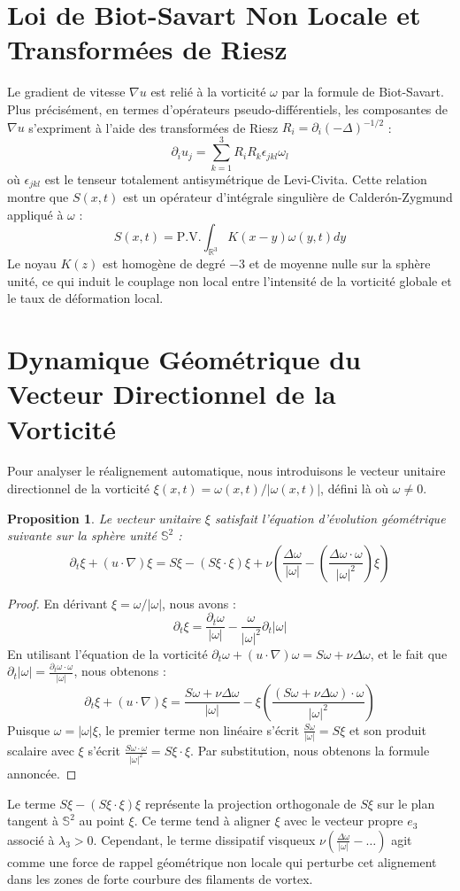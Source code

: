 \documentclass[11pt,a4paper]{article}
\newtheorem{proposition}[theorem]{Proposition}
\begin{document}
\section{Loi de Biot-Savart Non Locale et Transformées de Riesz}
Le gradient de vitesse $\nabla u$ est relié à la vorticité $\omega$ par la formule de Biot-Savart.
Plus précisément, en termes d'opérateurs pseudo-différentiels, les composantes de $\nabla u$ s'expriment à l'aide des transformées de Riesz $R_i = \partial_i (-\Delta)^{-1/2}$ :
$$ \partial_i u_j = \sum_{k=1}^3 R_i R_k \epsilon_{jkl} \omega_l $$
où $\epsilon_{jkl}$ est le tenseur totalement antisymétrique de Levi-Civita.
Cette relation montre que $S(x,t)$ est un opérateur d'intégrale singulière de Calderón-Zygmund appliqué à $\omega$ :
$$ S(x,t) = \text{P.V.} \int_{\mathbb{R}^3} K(x-y) \omega(y,t) dy $$
Le noyau $K(z)$ est homogène de degré $-3$ et de moyenne nulle sur la sphère unité, ce qui induit le couplage non local entre l'intensité de la vorticité globale et le taux de déformation local.

\section{Dynamique Géométrique du Vecteur Directionnel de la Vorticité}
Pour analyser le réalignement automatique, nous introduisons le vecteur unitaire directionnel de la vorticité $\xi(x,t) = \omega(x,t)/|\omega(x,t)|$, défini là où $\omega \neq 0$.

\begin{proposition}
Le vecteur unitaire $\xi$ satisfait l'équation d'évolution géométrique suivante sur la sphère unité $\mathbb{S}^2$ :
$$ \partial_t \xi + (u \cdot \nabla) \xi = S \xi - (S \xi \cdot \xi) \xi + \nu \left( \frac{\Delta \omega}{|\omega|} - \left( \frac{\Delta \omega \cdot \omega}{|\omega|^2} \right) \xi \right) $$
\end{proposition}
\begin{proof}
En dérivant $\xi = \omega / |\omega|$, nous avons :
$$ \partial_t \xi = \frac{\partial_t \omega}{|\omega|} - \frac{\omega}{|\omega|^2} \partial_t |\omega| $$
En utilisant l'équation de la vorticité $\partial_t \omega + (u \cdot \nabla) \omega = S \omega + \nu \Delta \omega$, et le fait que $\partial_t |\omega| = \frac{\partial_t \omega \cdot \omega}{|\omega|}$, nous obtenons :
$$ \partial_t \xi + (u \cdot \nabla) \xi = \frac{S\omega + \nu\Delta\omega}{|\omega|} - \xi \left( \frac{(S\omega + \nu\Delta\omega) \cdot \omega}{|\omega|^2} \right) $$
Puisque $\omega = |\omega|\xi$, le premier terme non linéaire s'écrit $\frac{S\omega}{|\omega|} = S\xi$ et son produit scalaire avec $\xi$ s'écrit $\frac{S\omega \cdot \omega}{|\omega|^2} = S\xi \cdot \xi$. Par substitution, nous obtenons la formule annoncée.
\end{proof}

Le terme $S \xi - (S \xi \cdot \xi) \xi$ représente la projection orthogonale de $S\xi$ sur le plan tangent à $\mathbb{S}^2$ au point $\xi$. Ce terme tend à aligner $\xi$ avec le vecteur propre $e_3$ associé à $\lambda_3 > 0$. Cependant, le terme dissipatif visqueux $\nu \left( \frac{\Delta \omega}{|\omega|} - \dots \right)$ agit comme une force de rappel géométrique non locale qui perturbe cet alignement dans les zones de forte courbure des filaments de vortex.
\end{document}
